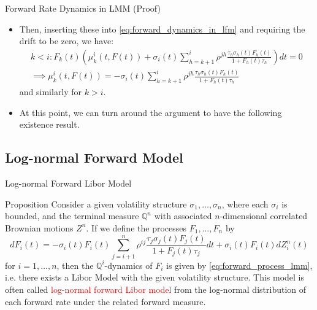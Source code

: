 \documentclass{beamer}
\begin{document}
\begin{frame}{Forward Rate Dynamics in LMM (Proof)}
	\begin{itemize}
	\item<1-> Then, inserting these into \cref{eq:forward_dynamics_in_lfm} and requiring the drift to be zero, we have:
		\begin{equation*}
			\begin{gathered}
				k < i : F_k(t)\left( \mu_k^i(t, F(t)) + \sigma_i(t)\sum_{h=k+1}^i \rho^{jh} \frac{\tau_h\sigma_h(t)F_h(t)}{1+F_h(t)\tau_h}\right) dt = 0 \\
				\implies \mu_k^i(t, F(t)) = - \sigma_i(t)\sum_{h=k+1}^i \rho^{jh} \frac{\tau_h\sigma_h(t)F_h(t)}{1+F_h(t)\tau_h}
			\end{gathered}
		\end{equation*}
		and similarly for $k > i$.
\myendproof
	\item<2-> At this point, we can turn around the argument to have the following existence result.
	\end{itemize}
\end{frame}

\subsection{Log-normal Forward Model}
\begin{frame}{Log-normal Forward Libor Model}
  \begin{block}{Proposition}
    Consider a given volatility structure $\sigma_1,\ldots, \sigma_n$, where each $\sigma_i$ is bounded, and the terminal measure $\mathbb{Q}^n$ with associated $n$-dimensional correlated Brownian motions $Z^n$. If we define the processes $F_1,\ldots, F_n$ by
    \begin{equation}
      dF_i(t) = -\sigma_i(t)F_i(t)\sum_{j=i+1}^n \rho^{ij} \frac{\tau_j\sigma_j(t)F_j(t)}{1+F_j(t)\tau_j} dt + \sigma_i(t)F_i(t)dZ^n_i(t)
    \end{equation}
    for $i = 1,\ldots, n$, then the $\mathbb{Q}^i$-dynamics of $F_i$ is given by \cref{eq:forward_process_lmm}, i.e. there exists a Libor Model with the given volatility structure.
  This model is often called \textcolor{red}{log-normal forward Libor model} from the log-normal distribution of each forward rate under the related forward measure.
  \end{block}
\end{frame}
\end{document}
